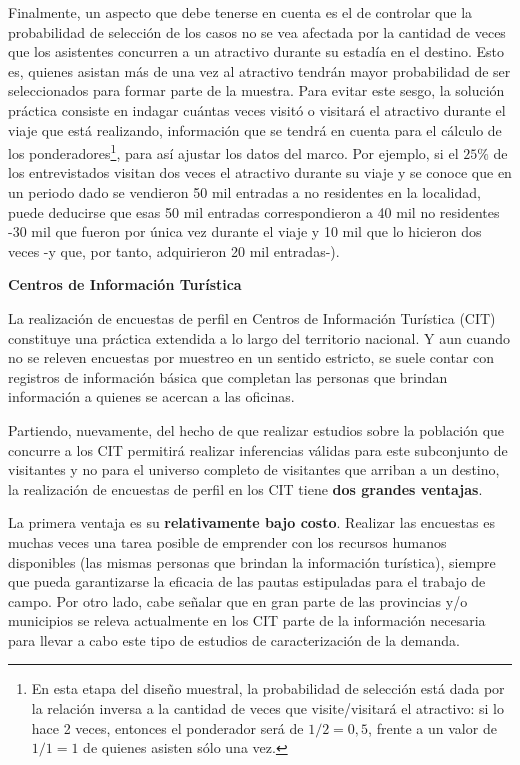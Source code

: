 \documentclass[
]{book}
\begin{document}
Finalmente, un aspecto que debe tenerse en cuenta es el de controlar que la probabilidad de selección de los casos no se vea afectada por la cantidad de veces que los asistentes concurren a un atractivo durante su estadía en el destino. Esto es, quienes asistan más de una vez al atractivo tendrán mayor probabilidad de ser seleccionados para formar parte de la muestra. Para evitar este sesgo, la solución práctica consiste en indagar cuántas veces visitó o visitará el atractivo durante el viaje que está realizando, información que se tendrá en cuenta para el cálculo de los ponderadores\footnote{En esta etapa del diseño muestral, la probabilidad de selección está dada por la relación inversa a la cantidad de veces que visite/visitará el atractivo: si lo hace 2 veces, entonces el ponderador será de \(1/2=0,5\), frente a un valor de \(1/1=1\) de quienes asisten sólo una vez.}, para así ajustar los datos del marco. Por ejemplo, si el \(25\%\) de los entrevistados visitan dos veces el atractivo durante su viaje y se conoce que en un periodo dado se vendieron 50 mil entradas a no residentes en la localidad, puede deducirse que esas 50 mil entradas correspondieron a 40 mil no residentes -30 mil que fueron por única vez durante el viaje y 10 mil que lo hicieron dos veces -y que, por tanto, adquirieron 20 mil entradas-).

\hfill\break
\textbf{Centros de Información Turística}

La realización de encuestas de perfil en Centros de Información Turística (CIT) constituye una práctica extendida a lo largo del territorio nacional. Y aun cuando no se releven encuestas por muestreo en un sentido estricto, se suele contar con registros de información básica que completan las personas que brindan información a quienes se acercan a las oficinas.

Partiendo, nuevamente, del hecho de que realizar estudios sobre la población que concurre a los CIT permitirá realizar inferencias válidas para este subconjunto de visitantes y no para el universo completo de visitantes que arriban a un destino, la realización de encuestas de perfil en los CIT tiene \textbf{dos grandes ventajas}.

La primera ventaja es su \textbf{relativamente bajo costo}. Realizar las encuestas es muchas veces una tarea posible de emprender con los recursos humanos disponibles (las mismas personas que brindan la información turística), siempre que pueda garantizarse la eficacia de las pautas estipuladas para el trabajo de campo. Por otro lado, cabe señalar que en gran parte de las provincias y/o municipios se releva actualmente en los CIT parte de la información necesaria para llevar a cabo este tipo de estudios de caracterización de la demanda.
\end{document}
